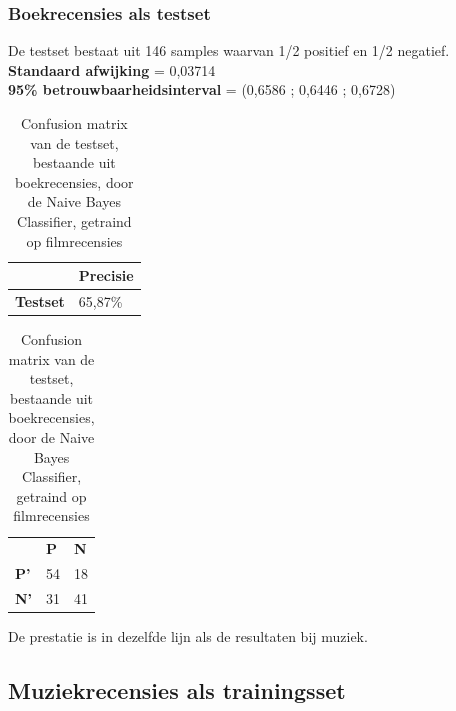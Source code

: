 \begin{appendices}
\subsubsection{Boekrecensies als testset}\label{Boekrecensies testset-movie}

De testset bestaat uit 146 samples waarvan 1/2 positief en 1/2 negatief.\\

\textbf{Standaard afwijking} = 0,03714\\
\textbf{95\% betrouwbaarheidsinterval} = (0,6586 ; 0,6446 ; 0,6728)\\
 
\begin{table}[h]
\centering
\setlength\tabcolsep{4pt}
\begin{minipage}[t]{0.48\textwidth}
\centering
\begin{tabular}{l|l|}
\cline{2-2}
                                            & \textbf{Precisie} \\ \hline
\multicolumn{1}{|l|}{\textbf{Testset}}      & 65,87\%           \\ \hline
\end{tabular}
\caption{Classificatieprecisie Naive Bayes Classifier, getraind op filmrecensies, getest op boekrecensies}
\end{minipage}%
\hfill
\begin{minipage}[t]{0.48\textwidth}
\centering
\begin{tabular}{lll}
                                 & \textbf{P}               & \textbf{N}               \\ \cline{2-3} 
\multicolumn{1}{l|}{\textbf{P'}} & \multicolumn{1}{l|}{54} & \multicolumn{1}{l|}{18} \\ \cline{2-3} 
\multicolumn{1}{l|}{\textbf{N'}} & \multicolumn{1}{l|}{31} & \multicolumn{1}{l|}{41} \\ \cline{2-3} 
\end{tabular}
\caption{Confusion matrix van de testset, bestaande uit boekrecensies, door de  Naive Bayes Classifier, getraind op filmrecensies} 
\end{minipage}
\end{table}

De prestatie is in dezelfde lijn als de resultaten bij muziek. 

\subsection{Muziekrecensies als trainingsset}\label{Muziekrecensies als trainingsset}


\end{appendices}
